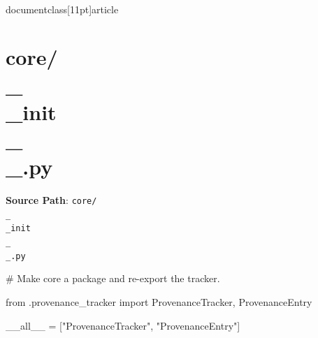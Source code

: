 \\documentclass[11pt]{article}
\begin{document}
\section*{core/\\_\\_init\\_\\_.py}
\textbf{Source Path}: \texttt{core/\\_\\_init\\_\\_.py}\par
\bigskip
\begin{CodeBlock}
# Make core a package and re-export the tracker.

from .provenance_tracker import ProvenanceTracker, ProvenanceEntry

__all__ = ["ProvenanceTracker", "ProvenanceEntry"]

\end{CodeBlock}
\end{document}
